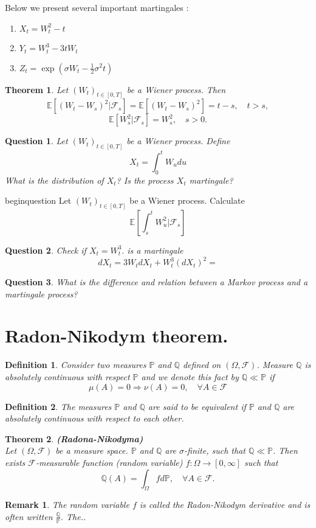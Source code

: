 \documentclass{book}
\newtheorem{definition}{Definition}[section]
\newtheorem{theorem}{Theorem}[section]
\newtheorem{remark}{Remark}[section]
\newtheorem{question}{Question}[section]
\begin{document}
Below we present several important martingales :
\begin{enumerate}
\item $X_{t}=W_{t}^{2}-t$
\item $Y_{t}=W_{t}^{3}-3tW_{t}$
\item $Z_{t}=\exp(\sigma W_{t}-\frac{1}{2}\sigma^{2}t)$
\end{enumerate}
\begin{theorem}
Let $(W_{t})_{t\in[0,T]}$ be a Wiener process. Then
$$
\mathbb{E}[(W_{t}-W_{s})^{2}|\mathcal{F}_{s}]=\mathbb{E}[(W_{t}-W_{s})^{2}]=t-s, \quad t>s,
$$
$$
\mathbb{E}[W_{s}^{2}|\mathcal{F}_{s}]=W_{s}^{2}, \quad s>0.
$$
\end{theorem}
\begin{question}
Let $(W_{t})_{t\in[0,T]}$ be a Wiener process. Define
$$
X_{t}=\int_{0}^{t}W_{u}du
$$
What is the distribution of $X_{t}$? Is the process $X_{t}$ martingale?
\end{question}
begin{question}
Let $(W_{t})_{t\in[0,T]}$ be a Wiener process. Calculate
$$
\mathbb{E}\left[\int_{s}^{t}W_{u}^{2}|\mathcal{F}_{s}\right]
$$
\begin{question}
Check if  $X_{t}=W_{t}^{3}.$ is a martingale 
$$
dX_{t}=3W_{t}dX_{t}+W_{t}^{3}(dX_{t})^{2}=
$$
\end{question}
\begin{question}
What is the difference and relation between a Markov process and a martingale process?
\end{question}
\section{Radon-Nikodym theorem.}
\begin{definition}
Consider two measures $\mathbb{P}$ and $\mathbb{Q}$ defined on $(\varOmega,\mathcal{F})$. Measure $\mathbb{Q}$ is absolutely continuous with respect $\mathbb{P}$ and we denote this fact by $\mathbb{Q}\ll\mathbb{P}$ if 
$$
\mu(A)=0\Longrightarrow\nu(A)=0, \quad \forall A\in \mathcal{F}
$$
\end{definition}
\begin{definition}
The measures $\mathbb{P}$ and $\mathbb{Q}$ are said to be equivalent if $\mathbb{P}$ and $\mathbb{Q}$ are absolutely continuous with respect to each other. 
\end{definition}
\begin{theorem}\textbf{(Radona-Nikodyma)}\\
Let $(\varOmega,\mathcal{F})$ be a measure space. $\mathbb{P}$ and $\mathbb{Q}$ are $\sigma$-finite, such that $\mathbb{Q}\ll\mathbb{P}$.
Then exists $\mathcal{F}$-measurable function (random variable) $f:\varOmega\rightarrow[0,\infty]$
such that
\begin{equation}
\nonumber
\mathbb{Q}(A)=\int_{\varOmega}fd\mathbb{P},\quad \forall A \in \mathcal{F}.
\end{equation}
\end{theorem}
\begin{remark}
The random variable $f$ is called the Radon-Nikodym derivative and is often written $\frac{\mathbb{Q}}{\mathbb{P}}.$ The..
\end{remark}
\end{document}

